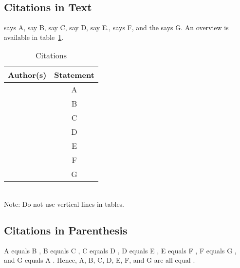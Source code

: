 \documentclass{ajae}
\begin{document}
\subsection{Citations in Text}
\citet{Black29} says A, \citet{Wold89} say B, \citet{Wold} say C,
\citet{Wold4} say D, \citet{Wold5} say E., \citet{Brown65} says F,
and the \citet{USDA65} says G.
An overview is available in table~\ref{tab:citations}.

\begin{table}[htbp]
\caption{Citations}
\label{tab:citations}
\begin{tabular}{lc}
\hline
Author(s) & Statement\\
\hline
\citet{Black29} & A\\
\citet{Wold89} & B\\
\citet{Wold} & C\\
\citet{Wold4} & D\\
\citet{Wold5} & E\\
\citet{Brown65} & F\\
\citet{USDA65} & G \\
\hline
\end{tabular}
\medskip \\
Note: Do not use vertical lines in tables.
\end{table}


\subsection{Citations in Parenthesis}
A equals B \citep{Black29}, B equals C \citep{Wold89}, C equals D \citep{Wold},
D equals E \citep{Wold4}, E equals F \citep{Wold5}, F equals G \citep{Brown65},
and G equals A \citep{USDA65}.
Hence, A, B, C, D, E, F, and G are all equal
\citep{Black29, Wold89, Wold, Wold4, Wold5, Brown65, USDA65}.

\end{document}
